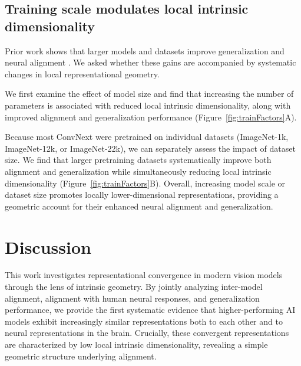 \documentclass{article}
\theoremstyle{plain}
\theoremstyle{definition}
\theoremstyle{remark}
\begin{document}
\subsection{Training scale modulates local intrinsic dimensionality}
\label{ssec:training_scale}



Prior work shows that larger models and datasets improve generalization and neural alignment \citep{conwell2024large}. We asked whether these gains are accompanied by systematic changes in local representational geometry.

We first examine the effect of model size and find that increasing the number of parameters is associated with reduced local intrinsic dimensionality, along with improved alignment and generalization performance (Figure~\ref{fig:trainFactors}A).

Because most ConvNext were pretrained on individual datasets (ImageNet-1k, ImageNet-12k, or ImageNet-22k), we can separately assess the impact of dataset size. We find that larger pretraining datasets systematically improve both alignment and generalization while simultaneously reducing local intrinsic dimensionality (Figure~\ref{fig:trainFactors}B).
Overall, increasing model scale or dataset size promotes locally lower-dimensional representations, providing a geometric account for their enhanced neural alignment and generalization.



\section{Discussion}


This work investigates representational convergence in modern vision models through the lens of intrinsic geometry.
By jointly analyzing inter-model alignment, alignment with human neural responses, and generalization performance, we provide the first systematic evidence that higher-performing AI models exhibit increasingly similar representations both to each other and to neural representations in the brain.
Crucially, these convergent representations are characterized by low local intrinsic dimensionality, revealing a simple geometric structure underlying alignment.
\end{document}
